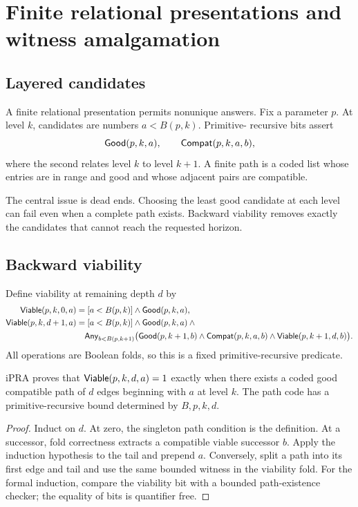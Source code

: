 \section{Finite relational presentations and witness amalgamation}
\label{sec:relations}

\subsection{Layered candidates}

A finite relational presentation permits nonunique answers.  Fix a parameter
\(p\).  At level \(k\), candidates are numbers \(a<B(p,k)\).  Primitive-
recursive bits assert
\[
 \mathsf{Good}(p,k,a),
 \qquad
 \mathsf{Compat}(p,k,a,b),
\]
where the second relates level \(k\) to level \(k+1\).  A finite path is a
coded list whose entries are in range and good and whose adjacent pairs are
compatible.

The central issue is dead ends.  Choosing the least good candidate at each
level can fail even when a complete path exists.  Backward viability removes
exactly the candidates that cannot reach the requested horizon.

\subsection{Backward viability}

Define viability at remaining depth \(d\) by
\begin{align*}
 \mathsf{Viable}(p,k,0,a)&=[a<B(p,k)]\wedge\mathsf{Good}(p,k,a),\\
 \mathsf{Viable}(p,k,d+1,a)&=[a<B(p,k)]\wedge\mathsf{Good}(p,k,a)\wedge{}\\
 &\quad\mathsf{Any}_{b<B(p,k+1)}
 \bigl(\mathsf{Good}(p,k+1,b)\wedge\mathsf{Compat}(p,k,a,b)
       \wedge\mathsf{Viable}(p,k+1,d,b)\bigr).
\end{align*}
All operations are Boolean folds, so this is a fixed primitive-recursive
predicate.

\begin{theorem}
\label{thm:viable-path}
iPRA proves that \(\mathsf{Viable}(p,k,d,a)=1\) exactly when there exists a coded good
compatible path of \(d\) edges beginning with \(a\) at level \(k\).  The path
code has a primitive-recursive bound determined by \(B,p,k,d\).
\end{theorem}

\begin{proof}
Induct on \(d\).  At zero, the singleton path condition is the definition.  At
a successor, fold correctness extracts a compatible viable successor \(b\).
Apply the induction hypothesis to the tail and prepend \(a\).  Conversely,
split a path into its first edge and tail and use the same bounded witness in
the viability fold.  For the formal induction, compare the viability bit with
a bounded path-existence checker; the equality of bits is quantifier free.
\end{proof}


